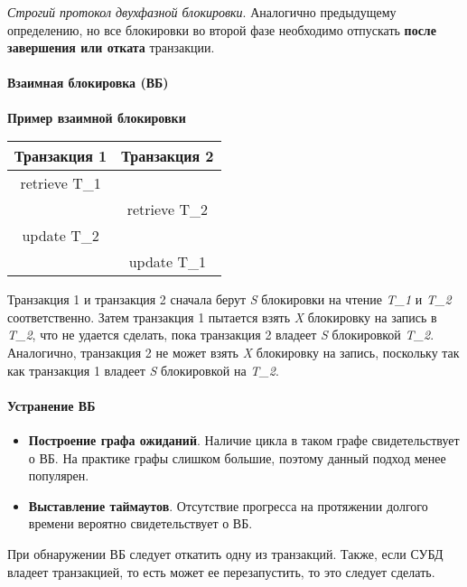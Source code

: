 \begin{definition}
    \textit{Строгий протокол двухфазной блокировки}. Аналогично предыдущему определению,
    но все блокировки во второй фазе необходимо отпускать \textbf{после завершения или отката}
    транзакции.
\end{definition}

\paragraph{Взаимная блокировка (ВБ)}

\textbf{Пример взаимной блокировки}

\begin{center}
    \begin{tabular}{|c c|}
        \hline
        Транзакция 1 & Транзакция 2 \\
        \hline
        retrieve T\_1 & \\
        & retrieve T\_2 \\
        update T\_2 & \\
        & update T\_1 \\
        \hline
    \end{tabular}
\end{center}

Транзакция 1 и транзакция 2 сначала берут \textit{S} блокировки на чтение \textit{T\_1} и
\textit{T\_2} соответственно. Затем транзакция 1 пытается взять \textit{X} блокировку на запись
в \textit{T\_2}, что не удается сделать, пока транзакция 2 владеет \textit{S} блокировкой
\textit{T\_2}. Аналогично, транзакция 2 не может взять \textit{X} блокировку на запись, поскольку
так как транзакция 1 владеет \textit{S} блокировкой на \textit{T\_2}.

\paragraph{Устранение ВБ}

\begin{itemize}
    \item \textbf{Построение графа ожиданий}. Наличие цикла в таком графе свидетельствует о ВБ. На
        практике графы слишком большие, поэтому данный подход менее популярен.
    \item \textbf{Выставление таймаутов}. Отсутствие прогресса на протяжении долгого времени
        вероятно свидетельствует о ВБ.
\end{itemize}

При обнаружении ВБ следует откатить одну из транзакций. Также, если СУБД владеет транзакцией, то
есть может ее перезапустить, то это следует сделать.

